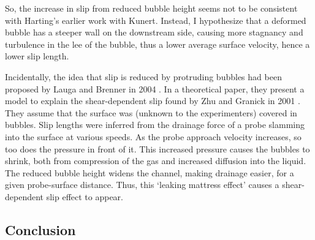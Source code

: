 \documentclass[a4paper]{report}
\begin{document}
So, the increase in slip from reduced bubble height seems not to be consistent with Harting's earlier work with Kunert.  Instead, I hypothesize that a deformed bubble has a steeper wall on the downstream side, causing more stagnancy and turbulence in the lee of the bubble, thus a lower average surface velocity, hence a lower slip length.

\begin{center}
\end{center}


Incidentally, the idea that slip is reduced by protruding bubbles had been proposed by Lauga and Brenner in 2004 \cite{LaugaBrenner2004}.  In a theoretical paper, they present a model to explain the shear-dependent slip found by Zhu and Granick in 2001 \cite{ZhuGranick2001}.  They assume that the surface was (unknown to the experimenters) covered in bubbles.  Slip lengths were inferred from the drainage force of a probe slamming into the surface at various speeds. As the probe approach velocity increases, so too does the pressure in front of it.  This increased pressure causes the bubbles to shrink, both from compression of the gas and increased diffusion into the liquid.  The reduced bubble height widens the channel, making drainage easier, for a given probe-surface distance.  Thus, this `leaking mattress effect' causes a
\nopagebreak[0] shear-dependent slip effect to appear.


\subsection*{Conclusion}
\end{document}
